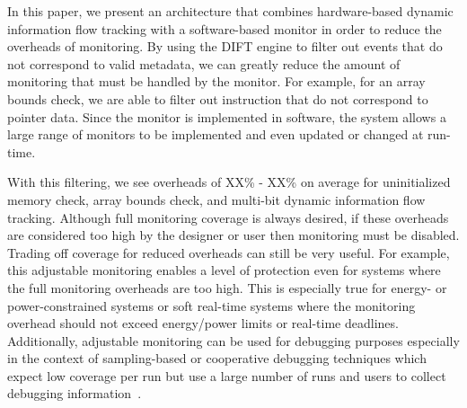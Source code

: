 
In this paper, we present an architecture that combines hardware-based dynamic
information flow tracking with a software-based monitor in order to reduce the
overheads of monitoring. By using the DIFT engine to filter out events that do
not correspond to valid metadata, we can greatly reduce the amount of
monitoring that must be handled by the monitor. For example, for an array
bounds check, we are able to filter out instruction that do not correspond to
pointer data. Since the monitor is implemented in software, the system allows a
large range of monitors to be implemented and even updated or changed at
run-time. 

With this filtering, we see overheads of XX\% - XX\% on average for
uninitialized memory check, array bounds check, and multi-bit dynamic
information flow tracking. Although full monitoring coverage is always desired,
if these overheads are considered too high by the designer or user then
monitoring must be disabled.
Trading off coverage for
reduced overheads can still be very useful. For example, this adjustable
monitoring enables a level of protection even for systems where the full
monitoring overheads are too high.  This is especially true for energy- or
power-constrained systems or soft real-time systems where the monitoring
overhead should not exceed energy/power limits or real-time deadlines. 
Additionally, adjustable monitoring can be used for debugging purposes
especially in the context of sampling-based or cooperative debugging techniques
which expect low coverage per run but use a large number of runs and users to
collect debugging information~\cite{liblit-pldi05,
chilimbi-asplos04, greathouse-cgo11}. 

